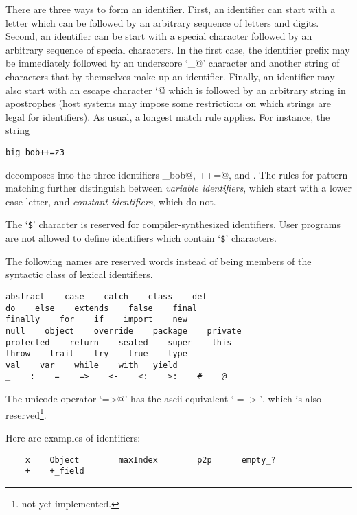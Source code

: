 \documentclass[a4paper,12pt,twoside,titlepage]{book}
\newcommand{\notyet}{\footnote{not yet implemented.}}
\begin{document}
There are three ways to form an identifier. First, an identifier can
start with a letter which can be followed by an arbitrary sequence of
letters and digits. Second, an identifier can be start with a special
character followed by an arbitrary sequence of special characters.  In
the first case, the identifier prefix may be immediately followed by
an underscore `\lstinline@_@' character and another string of
characters that by themselves make up an identifier.  Finally, an
identifier may also start with an escape character \lstinline@`\'@
which is followed by an arbitrary string in apostrophes (host systems
may impose some restrictions on which strings are legal for
identifiers).  As usual, a longest match rule applies. For instance,
the string

\begin{lstlisting}
big_bob++=z3
\end{lstlisting}

decomposes into the three identifiers \lstinline@big_bob@, \lstinline@++=@, and
.  The rules for pattern matching further distinguish between
{\em variable identifiers}, which start with a lower case letter, and
{\em constant identifiers}, which do not.


The `\lstinline[mathescape=false]@$@'\comment{$} character is reserved for compiler-synthesized identifiers.
User programs are not allowed to define identifiers which contain `\lstinline[mathescape=false]@$@'\comment{$}
characters. 

The following names are reserved words instead of being members of the
syntactic class  of lexical identifiers.

\begin{lstlisting}
abstract    case    catch    class    def    
do    else    extends    false    final    
finally    for    if    import    new    
null    object    override    package    private    
protected    return    sealed    super    this    
throw    trait    try    true    type    
val    var    while    with   yield
_    :    =    =>    <-    <:    >:    #    @
\end{lstlisting}

The unicode operator `\lstinline@=>@' has the ascii equivalent
`$=>$', which is also reserved\notyet.

\example
Here are examples of identifiers:
\begin{lstlisting}
    x    Object        maxIndex        p2p      empty_?
    +    +_field
\end{lstlisting}
\end{document}
